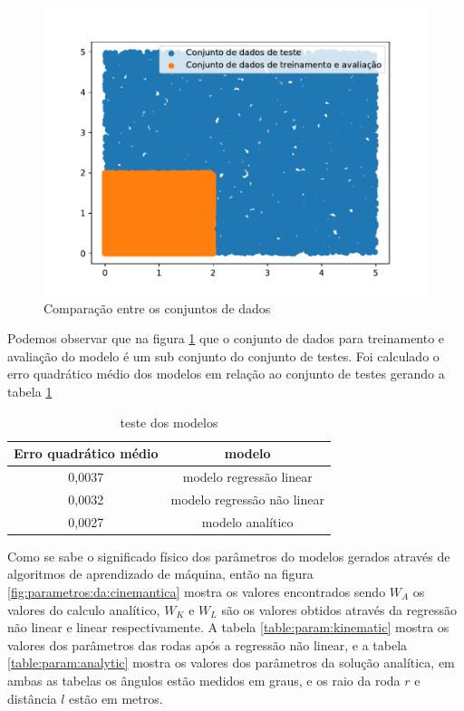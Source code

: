\begin{figure}[H]
    \label{fig:conj:dados}
    \centering
    \includegraphics[scale=0.5]{figuras/conj_dados.pdf}
    \caption{Comparação entre os conjuntos de dados}
\end{figure}

Podemos observar que na figura \ref{fig:conj:dados} que o conjunto
de dados para treinamento e avaliação do modelo 
é um sub conjunto do conjunto de testes. Foi calculado o erro quadrático
médio dos modelos em relação ao conjunto de testes gerando a
tabela \ref{table:mse:test}


\begin{table}[H]
    \label{table:mse:test}
    \centering
    \begin{tabular}{c|c}
        \hline
        Erro quadrático médio & modelo \\
        \hline
        0,0037 & modelo regressão linear \\
        \hline
        0,0032 & modelo regressão não linear \\
        \hline
        0,0027 & modelo analítico \\
        \hline
    \end{tabular}
    \caption{teste dos modelos}
\end{table}

Como se sabe o significado físico dos parâmetros do modelos gerados
através de algoritmos de aprendizado de máquina, então na figura
\ref{fig:parametros:da:cinemantica} mostra os valores encontrados
sendo $W_{A}$ os valores do calculo analítico, $W_{K}$ e $W_{L}$ 
são os valores obtidos através da regressão não linear e linear
respectivamente. A tabela \ref{table:param:kinematic} mostra os valores
dos parâmetros das rodas após a regressão não linear, e a tabela
\ref{table:param:analytic} mostra os valores dos parâmetros da
solução analítica, em ambas as tabelas os ângulos estão medidos
em graus, e os raio da roda $r$ e distância $l$ estão em metros.
 
